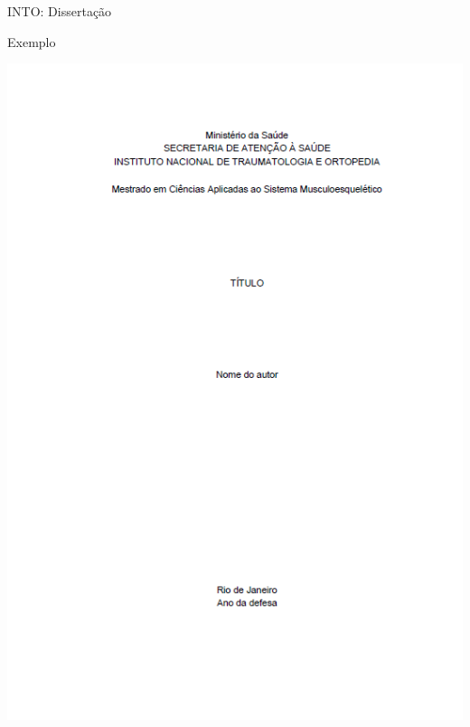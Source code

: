\documentclass{beamer}
\begin{document}

\begin{frame}{INTO: Dissertação}
  \begin{exampleblock}{Exemplo}
    \begin{center}
      \includegraphics[height=\textheight]{EstruturaII/dirce}
    \end{center}
  \end{exampleblock}
\end{frame}
\end{document}
